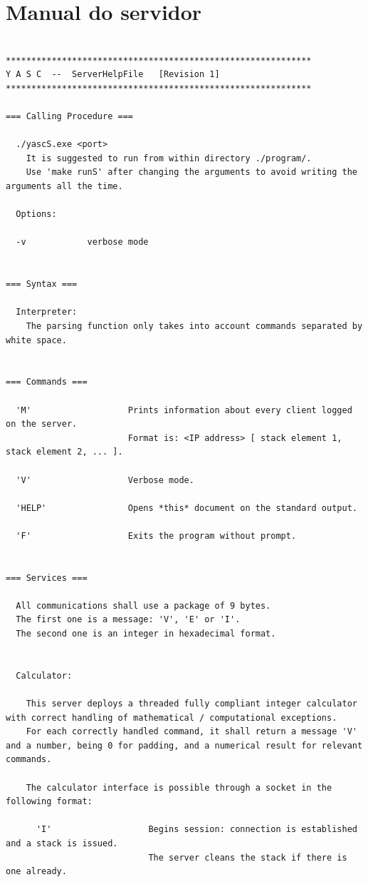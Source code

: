 \clearpage
\section{Manual do servidor\label{app:manS}}

\begin{lstlisting}

************************************************************
Y A S C  --  ServerHelpFile   [Revision 1]
************************************************************

=== Calling Procedure ===

  ./yascS.exe <port>
    It is suggested to run from within directory ./program/.
    Use 'make runS' after changing the arguments to avoid writing the arguments all the time.

  Options:

  -v            verbose mode


=== Syntax ===

  Interpreter:
    The parsing function only takes into account commands separated by white space.


=== Commands ===

  'M'                   Prints information about every client logged on the server.
                        Format is: <IP address> [ stack element 1, stack element 2, ... ].

  'V'                   Verbose mode.

  'HELP'                Opens *this* document on the standard output.

  'F'                   Exits the program without prompt.


=== Services ===

  All communications shall use a package of 9 bytes.
  The first one is a message: 'V', 'E' or 'I'.
  The second one is an integer in hexadecimal format.


  Calculator:

    This server deploys a threaded fully compliant integer calculator with correct handling of mathematical / computational exceptions.
    For each correctly handled command, it shall return a message 'V' and a number, being 0 for padding, and a numerical result for relevant commands.

    The calculator interface is possible through a socket in the following format:

      'I'                   Begins session: connection is established and a stack is issued.
                            The server cleans the stack if there is one already.


\end{lstlisting}
